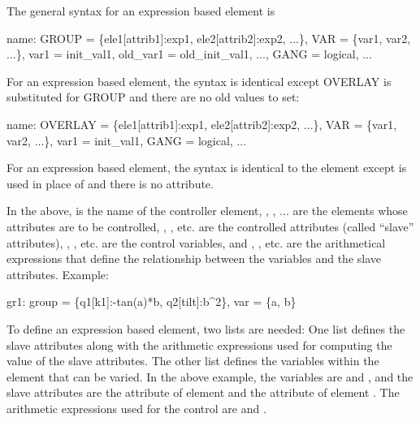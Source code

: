 The general syntax for an expression based  element is
\begin{example}
  name: GROUP = \{ele1[attrib1]:exp1, ele2[attrib2]:exp2, ...\}, 
          VAR = \{var1, var2, ...\}, var1 = init_val1, 
          old_var1 = old_init_val1, ..., GANG = logical, ...
\end{example}
For an expression based  element, the syntax is identical except OVERLAY is
substituted for GROUP and there are no old values to set:
\begin{example}
  name: OVERLAY = \{ele1[attrib1]:exp1, ele2[attrib2]:exp2, ...\}, 
          VAR = \{var1, var2, ...\}, var1 = init_val1, GANG = logical, ...
\end{example}
For an expression based  element, the syntax is identical to the  element
except  is used in place of  and there is no  attribute.

In the above,  is the name of the controller element, , , ... are the
elements whose attributes are to be controlled, , , etc. are the controlled
attributes (called ``slave'' attributes), , , etc. are the control variables, and
, , etc. are the arithmetical expressions that define the relationship between the
variables and the slave attributes. Example:
\begin{example}
  gr1: group = \{q1[k1]:-tan(a)*b, q2[tilt]:b^2\}, var = \{a, b\}
\end{example}

To define an expression based  element, two lists are needed: One list defines the
slave attributes along with the arithmetic expressions used for computing the value of the slave
attributes. The other list defines the variables within the  element that can be
varied. In the above example, the variables are  and , and the slave attributes are the
 attribute of element  and the  attribute of element . The arithmetic
expressions used for the control are  and .

